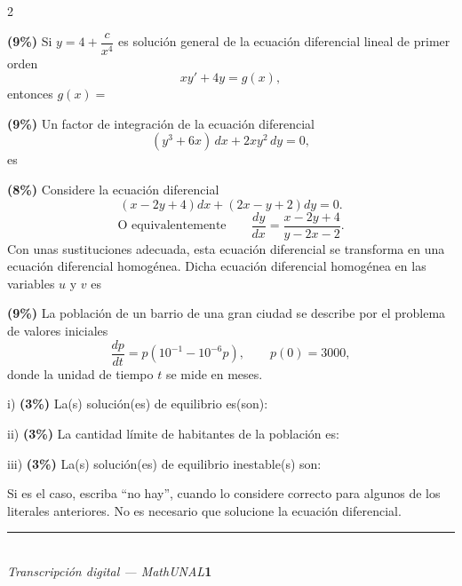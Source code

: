 \documentclass[11pt]{article}
\begin{document}
\begin{multicols}{2}

\begin{opciones}
\item[(a)] \textbf{(9\%)} Si $y=4+\dfrac{c}{x^4}$ es solución general de la ecuación diferencial lineal de primer orden
\[
xy'+4y=g(x),
\]
entonces $g(x)=$ \underline{\hspace{3cm}}

\item[(b)] \textbf{(9\%)} Un factor de integración de la ecuación diferencial
\[
(y^3+6x)\,dx+2xy^2\,dy=0,
\]
es \underline{\hspace{3cm}}

\columnbreak

\item[(c)] \textbf{(8\%)} Considere la ecuación diferencial
\[
(x-2y+4)dx+(2x-y+2)dy=0.
\]
\[
\text{O equivalentemente} \qquad \frac{dy}{dx}=\frac{x-2y+4}{y-2x-2}.
\]
Con unas sustituciones adecuada, esta ecuación diferencial se transforma en una ecuación diferencial homogénea. Dicha ecuación diferencial homogénea en las variables $u$ y $v$ es

\underline{\hspace{5cm}}

\item[(d)] \textbf{(9\%)} La población de un barrio de una gran ciudad se describe por el problema de valores iniciales
\[
\frac{dp}{dt}=p(10^{-1}-10^{-6}p), \qquad p(0)=3000,
\]
donde la unidad de tiempo $t$ se mide en meses.

i) \textbf{(3\%)} La(s) solución(es) de equilibrio es(son): \underline{\hspace{2cm}}

ii) \textbf{(3\%)} La cantidad límite de habitantes de la población es: \underline{\hspace{2cm}}

iii) \textbf{(3\%)} La(s) solución(es) de equilibrio inestable(s) son: \underline{\hspace{2cm}}

Si es el caso, escriba ``no hay'', cuando lo considere correcto para algunos de los literales anteriores. No es necesario que solucione la ecuación diferencial.
\end{opciones}

\end{multicols}

\vfill
\rule{\linewidth}{0.4pt}\\[1pt]
{\scriptsize\textit{Transcripción digital --- MathUNAL}\hfill\textcolor{unalblue}{\textbf{1}}}
\end{document}

